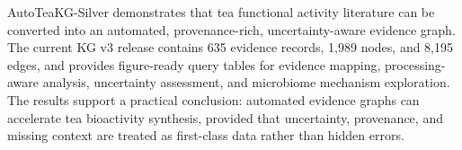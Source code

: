 \documentclass[11pt]{article}
\begin{document}
AutoTeaKG-Silver demonstrates that tea functional activity literature can be converted into an automated, provenance-rich, uncertainty-aware evidence graph. The current KG v3 release contains 635 evidence records, 1,989 nodes, and 8,195 edges, and provides figure-ready query tables for evidence mapping, processing-aware analysis, uncertainty assessment, and microbiome mechanism exploration. The results support a practical conclusion: automated evidence graphs can accelerate tea bioactivity synthesis, provided that uncertainty, provenance, and missing context are treated as first-class data rather than hidden errors.



\end{document}
